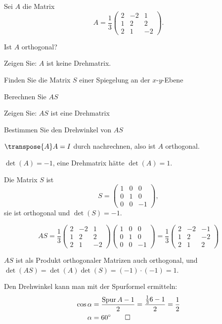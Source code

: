 Sei $A$ die Matrix
\[
A=\frac13\begin{pmatrix}
2&-2& 1\\
1& 2& 2\\
2& 1&-2
\end{pmatrix}.
\]
\begin{teilaufgaben}
\item Ist $A$ orthogonal?
\item Zeigen Sie: $A$ ist keine Drehmatrix.
\item Finden Sie die Matrix $S$ einer Spiegelung an der $x$-$y$-Ebene
\item Berechnen Sie $AS$
\item Zeigen Sie: $AS$ ist eine Drehmatrix
\item Bestimmen Sie den Drehwinkel von $AS$
\end{teilaufgaben}


\begin{loesung}
\begin{teilaufgaben}
\item $\transpose{A}A=I$ durch nachrechnen, also ist $A$ orthogonal.
\item $\det(A)=-1$, eine Drehmatrix hätte $\det(A)=1$.
\item Die Matrix $S$ ist
\[
S=\begin{pmatrix}1&0&0\\0&1&0\\0&0&-1\end{pmatrix},
\]
sie ist orthogonal und $\det(S)=-1$.
\item
\[
AS=\frac13\begin{pmatrix}
2&-2& 1\\
1& 2& 2\\
2& 1&-2
\end{pmatrix}
\begin{pmatrix}1&0&0\\0&1&0\\0&0&-1\end{pmatrix}
=
\frac13\begin{pmatrix}
2&-2&-1\\
1& 2&-2\\
2& 1& 2
\end{pmatrix}
\]
\item $AS$ ist als Produkt orthogonaler Matrizen auch orthogonal,
und $\det(AS)=\det(A)\det(S)=(-1)\cdot(-1)=1$.
\item Den Drehwinkel kann man mit der Spurformel ermitteln:
\begin{align*}
\cos\alpha&= \frac{\operatorname{Spur} A -1}2=\frac{\frac136-1}2=\frac12
\\
\alpha&=60^\circ
\qedhere
\end{align*}
\end{teilaufgaben}
\end{loesung}

